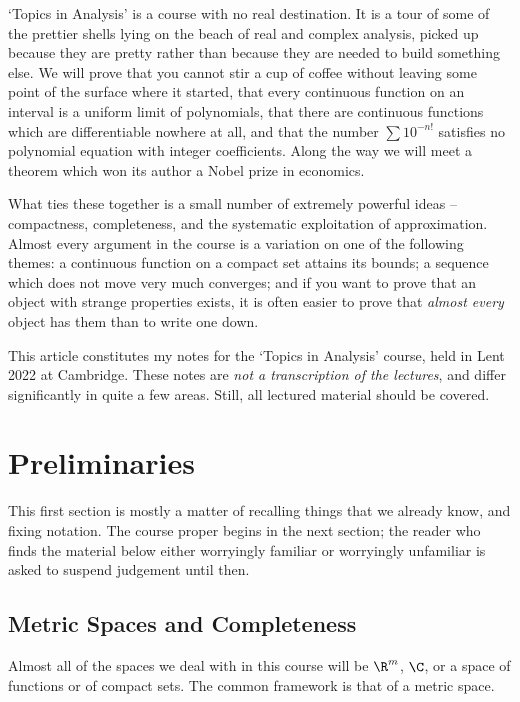 



`Topics in Analysis' is a course with no real destination. It is a tour of some of the prettier shells lying on the beach of real and complex analysis, picked up because they are pretty rather than because they are needed to build something else. We will prove that you cannot stir a cup of coffee without leaving some point of the surface where it started, that every continuous function on an interval is a uniform limit of polynomials, that there are continuous functions which are differentiable nowhere at all, and that the number $\sum 10^{-n!}$ satisfies no polynomial equation with integer coefficients. Along the way we will meet a theorem which won its author a Nobel prize in economics.

What ties these together is a small number of extremely powerful ideas -- compactness, completeness, and the systematic exploitation of approximation. Almost every argument in the course is a variation on one of the following themes: a continuous function on a compact set attains its bounds; a sequence which does not move very much converges; and if you want to prove that an object with strange properties exists, it is often easier to prove that \emph{almost every} object has them than to write one down.

This article constitutes my notes for the `Topics in Analysis' course, held in Lent 2022 at Cambridge. These notes are \emph{not a transcription of the lectures}, and differ significantly in quite a few areas. Still, all lectured material should be covered.



\section{Preliminaries}

This first section is mostly a matter of recalling things that we already know, and fixing notation. The course proper begins in the next section; the reader who finds the material below either worryingly familiar or worryingly unfamiliar is asked to suspend judgement until then.

\subsection{Metric Spaces and Completeness}

Almost all of the spaces we deal with in this course will be $\R^m$, $\C$, or a space of functions or of compact sets. The common framework is that of a metric space.

